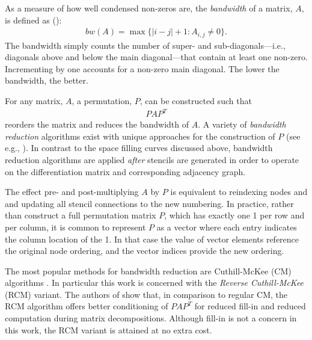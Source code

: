 \documentclass{report}
\begin{document}

As a measure of how well condensed non-zeros are, the \emph{bandwidth} of a matrix, $A$, is defined as (\cite{Cuthill1969, LiuSherman1976}): 
\begin{align}
bw(A) = \max\{|i - j| + 1 : A_{i,j} \neq 0\}.
\end{align}
The bandwidth simply counts the number of super- and sub-diagonals---i.e., diagonals above and below the main diagonal---that contain at least one non-zero. Incrementing by one accounts for a non-zero main diagonal. The lower the bandwidth, the better. 

For any matrix, $A$, a permutation, $P$, can be constructed such that 
\begin{align}
P A P^T
\end{align}
reorders the matrix and reduces the bandwidth of $A$. A variety of \emph{bandwidth reduction} algorithms exist with unique approaches for the construction of $P$ (see e.g., \cite{Gibbs1976, LiuSherman1976, MellorCrummey2001}).  In contrast to the space filling curves discussed above, bandwidth reduction algorithms are applied \emph{after} stencils are generated in order to operate on the differentiation matrix and corresponding adjacency graph. 

The effect pre- and post-multiplying $A$ by $P$ is equivalent to reindexing nodes and and updating all stencil connections to the new numbering. In practice, rather than construct a full permutation matrix $P$, which has exactly one 1 per row and per column, it is common to represent $P$ as a vector where each entry indicates the column location of the 1. In that case the value of vector elements reference the original node ordering, and the vector indices provide the new ordering. 

The most popular methods for bandwidth reduction are Cuthill-McKee (CM) algorithms \cite{Cuthill1969, LiuSherman1976}. In particular this work is concerned with the \emph{Reverse Cuthill-McKee} (RCM) variant. The authors of \cite{LiuSherman1976} show that, in comparison to regular CM, the RCM algorithm offers better conditioning of $PAP^T$ for reduced fill-in and reduced computation during matrix decompositions. Although fill-in is not a concern in this work, the RCM variant is attained at no extra cost.
\end{document}
